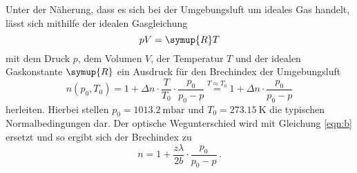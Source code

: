 Unter der Näherung, dass es sich bei der Umgebungsluft um ideales Gas handelt, lässt sich mithilfe der idealen Gasgleichung 
\begin{equation*}
    p V =\symup{R} T
\end{equation*}
mit dem Druck $p$, dem Volumen $V$, der Temperatur $T$ und der idealen Gaskonstante $\symup{R}$ ein Ausdruck 
für den Brechindex der Umgebungsluft 
\begin{equation*}
    n(p_0,T_0)=1+\Delta n \cdot \frac{T}{T_0}\cdot \frac{p_0}{p_0-p} \stackrel{T\approx T_0}{=} 1+\Delta n \cdot \frac{p_0}{p_0-p}
\end{equation*}
herleiten. 
Hierbei stellen $p_0=\SI{1013.2}{\milli\bar}$ und $T_0=\SI{273.15}{\kelvin}$ die typischen Normalbedingungen dar\cite{Versuchsanleitung}. 
Der optische Wegunterschied wird mit Gleichung \eqref{eqn:b} ersetzt und so ergibt sich der Brechindex zu 
\begin{equation}
    n=1+\frac{z\lambda}{2b} \cdot \frac{p_0}{p_0-p} \,.
    \label{eqn:Brechi}
\end{equation}